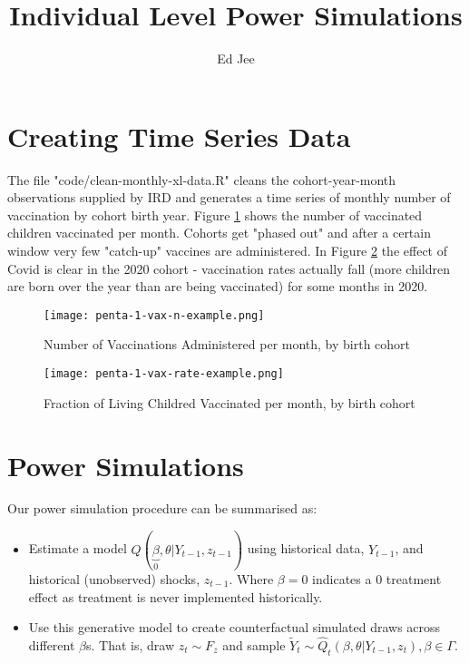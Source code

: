 \documentclass{article}
\author{Ed Jee}
\title{Individual Level Power Simulations}
\begin{document}
\maketitle



\section*{Creating Time Series Data}


The file "code/clean-monthly-xl-data.R" cleans the cohort-year-month observations 
supplied by IRD and generates a time series of monthly number of vaccination by 
cohort birth year. Figure \ref{fig:n-penta} shows the number of vaccinated 
children vaccinated per month.  Cohorts get "phased out" and after a certain 
window very few "catch-up" vaccines are administered. In Figure \ref{fig:p-penta}  
the effect of Covid is clear in the 2020 cohort - vaccination rates actually fall 
(more children are born over the year than are being vaccinated) for some months in 
2020.

\begin{figure}[H]
    \centering
    \texttt{[image: penta-1-vax-n-example.png]}
    \caption{Number of Vaccinations Administered per month, by birth cohort}
    \label{fig:n-penta}
\end{figure}

\begin{figure}[H]
    \centering
    \texttt{[image: penta-1-vax-rate-example.png]}
    \caption{Fraction of Living Childred Vaccinated per month, by birth cohort}
    \label{fig:p-penta}
\end{figure}


\section*{Power Simulations}

Our power simulation procedure can be summarised as:

\begin{itemize}
    \item Estimate a model $Q(\underbrace{\beta}_0, \theta | Y_{t-1}, z_{t-1})$ using historical data, $Y_{t-1}$, and historical (unobserved) shocks, $z_{t-1}$. 
    Where $\beta= 0$ indicates a 0 treatment effect as treatment is never implemented historically.
    \item Use this generative model to create counterfactual simulated draws across different $\beta$s. 
    That is, draw $z_t \sim F_z$ and sample  $\tilde{Y}_t \sim \hat{Q}_t(\beta, \theta | Y_{t-1}, z_t), \beta \in \Gamma$.
\end{itemize}
\end{document}
